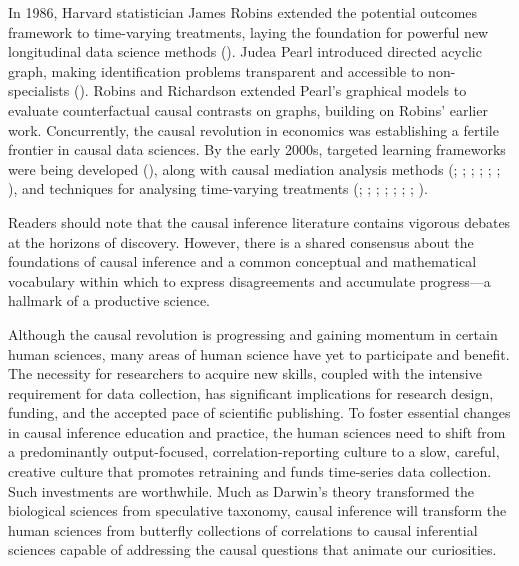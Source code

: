 \documentclass[
  single column]{article}
\begin{document}
In 1986, Harvard statistician James Robins extended the potential
outcomes framework to time-varying treatments, laying the foundation for
powerful new longitudinal data science methods
(). Judea Pearl introduced
directed acyclic graph, making identification problems transparent and
accessible to non-specialists ().
Robins and Richardson extended Pearl's graphical models to evaluate
counterfactual causal contrasts on graphs, building on Robins' earlier
work. Concurrently, the causal revolution in economics was establishing
a fertile frontier in causal data sciences. By the early 2000s, targeted
learning frameworks were being developed
(), along with
causal mediation analysis methods (; ;
;
;
;
;
), and
techniques for analysing time-varying treatments
(;
;
;
;
;
;
;
).

Readers should note that the causal inference literature contains
vigorous debates at the horizons of discovery. However, there is a
shared consensus about the foundations of causal inference and a common
conceptual and mathematical vocabulary within which to express
disagreements and accumulate progress---a hallmark of a productive
science.

Although the causal revolution is progressing and gaining momentum in
certain human sciences, many areas of human science have yet to
participate and benefit. The necessity for researchers to acquire new
skills, coupled with the intensive requirement for data collection, has
significant implications for research design, funding, and the accepted
pace of scientific publishing. To foster essential changes in causal
inference education and practice, the human sciences need to shift from
a predominantly output-focused, correlation-reporting culture to a slow,
careful, creative culture that promotes retraining and funds time-series
data collection. Such investments are worthwhile. Much as Darwin's
theory transformed the biological sciences from speculative taxonomy,
causal inference will transform the human sciences from butterfly
collections of correlations to causal inferential sciences capable of
addressing the causal questions that animate our curiosities.
\end{document}
